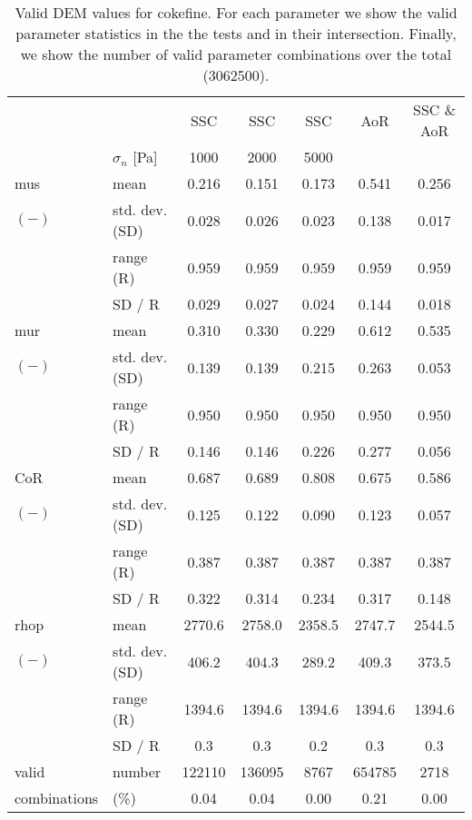 \begin{table}[htbp] 
 \centering 
\begin{tabular}{ll|ccccc} 
 \hline 
 &    & SSC & SSC & SSC & AoR   & SSC \& AoR \\ 
 & $\sigma_n$  [Pa]  & 1000 & 2000 & 5000 &   &  \\ 
 \hline 
\acs{mus} & mean & 0.216 & 0.151 & 0.173 & 0.541 & 0.256 \\ 
$(-)$ & std. dev. (SD) & 0.028 & 0.026 & 0.023 & 0.138 & 0.017 \\ 
 & range (\acs{R}) & 0.959 & 0.959 & 0.959 & 0.959 & 0.959 \\ 
 & SD / R & 0.029 & 0.027 & 0.024 & 0.144 & 0.018 \\ 
 \hline 
\acs{mur} & mean & 0.310 & 0.330 & 0.229 & 0.612 & 0.535 \\ 
$(-)$ & std. dev. (SD) & 0.139 & 0.139 & 0.215 & 0.263 & 0.053 \\ 
 & range (\acs{R}) & 0.950 & 0.950 & 0.950 & 0.950 & 0.950 \\ 
 & SD / R & 0.146 & 0.146 & 0.226 & 0.277 & 0.056 \\ 
 \hline 
\acs{CoR} & mean & 0.687 & 0.689 & 0.808 & 0.675 & 0.586 \\ 
$(-)$ & std. dev. (SD) & 0.125 & 0.122 & 0.090 & 0.123 & 0.057 \\ 
 & range (\acs{R}) & 0.387 & 0.387 & 0.387 & 0.387 & 0.387 \\ 
 & SD / R & 0.322 & 0.314 & 0.234 & 0.317 & 0.148 \\ 
 \hline 
\acs{rhop} & mean & 2770.6 & 2758.0 & 2358.5 & 2747.7 & 2544.5 \\ 
$(-)$ & std. dev. (SD) & 406.2 & 404.3 & 289.2 & 409.3 & 373.5 \\ 
 & range (\acs{R}) & 1394.6 & 1394.6 & 1394.6 & 1394.6 & 1394.6 \\ 
 & SD / R &  0.3 &  0.3 &  0.2 &  0.3 &  0.3 \\ 
 \hline 
valid & number & 122110 & 136095 & 8767 & 654785 & 2718 \\ 
combinations & (\%)  & 0.04 & 0.04 & 0.00 & 0.21 & 0.00 \\ 
 \hline 
\end{tabular} 
\caption[Valid DEM values for cokefine]{Valid DEM values for cokefine. For each parameter we show the valid parameter statistics in the the tests and in their intersection. Finally, we show the number of valid parameter combinations over the total (3062500).} 
\label{tab:26DEMvalidvaluescokefine} 
\end{table}